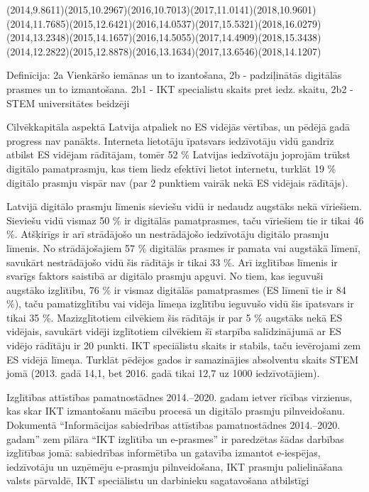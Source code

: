   {(2014,9.8611)(2015,10.2967)(2016,10.7013)(2017,11.0141)(2018,10.9601)}
  {(2014,11.7685)(2015,12.6421)(2016,14.0537)(2017,15.5321)(2018,16.0279)}
  {(2014,13.2348)(2015,14.1657)(2016,14.5055)(2017,14.4909)(2018,15.3438)}
  {(2014,12.2822)(2015,12.8878)(2016,13.1634)(2017,13.6546)(2018,14.1207)}

Definīcija: 2a Vienkāršo iemānas un to izantošana, 2b - padziļinātās digitālās prasmes un to izmantošana.
2b1 - IKT specialistu skaits pret iedz. skaitu, 2b2 - STEM universitātes beidzēji


Cilvēkkapitāla aspektā Latvija atpaliek no ES vidējās vērtības, un pēdējā gadā progress nav
panākts. Interneta lietotāju īpatsvars iedzīvotāju vidū gandrīz atbilst ES vidējam rādītājam,
tomēr 52 \% Latvijas iedzīvotāju joprojām trūkst digitālo pamatprasmju, kas tiem liedz efektīvi
lietot internetu, turklāt 19 \% digitālo prasmju vispār nav (par 2 punktiem vairāk nekā ES
vidējais rādītājs).
\par
Latvijā digitālo prasmju līmenis sieviešu vidū ir nedaudz augstāks nekā vīriešiem. Sieviešu
vidū vismaz 50 \% ir digitālās pamatprasmes, taču vīriešiem tie ir tikai 46 \%. Atšķirīgs ir arī
strādājošo un nestrādājošo iedzīvotāju digitālo prasmju līmenis. No strādājošajiem 57 \%
digitālās prasmes ir pamata vai augstākā līmenī, savukārt nestrādājošo vidū šis rādītājs ir
tikai 33 \%. Arī izglītības līmenis ir svarīgs faktors saistībā ar digitālo prasmju apguvi. No tiem,
kas ieguvuši augstāko izglītību, 76 \% ir vismaz digitālās pamatprasmes (ES līmenī tie ir
84 \%), taču pamatizglītību vai vidēja līmeņa izglītību ieguvušo vidū šis īpatsvars ir tikai 35 \%.
Mazizglītotiem cilvēkiem šis rādītājs ir par 5 \% augstāks nekā ES vidējais, savukārt vidēji
izglītotiem cilvēkiem šī starpība salīdzinājumā ar ES vidējo rādītāju ir 20 punkti. IKT
speciālistu skaits ir stabils, taču ievērojami zem ES vidējā līmeņa. Turklāt pēdējos gados ir
samazinājies absolventu skaits STEM jomā (2013. gadā 14,1, bet 2016. gadā tikai 12,7 uz
1000 iedzīvotājiem).
\par
Izglītības attīstības pamatnostādnes 2014.–2020. gadam ietver rīcības virzienus, kas skar
IKT izmantošanu mācību procesā un digitālo prasmju pilnveidošanu. Dokumentā
“Informācijas sabiedrības attīstības pamatnostādnes 2014.–2020. gadam” zem pīlāra “IKT
izglītība un e-prasmes” ir paredzētas šādas darbības izglītības jomā: sabiedrības informētība
un gatavība izmantot e-iespējas, iedzīvotāju un uzņēmēju e-prasmju pilnveidošana, IKT
prasmju palielināšana valsts pārvaldē, IKT speciālistu un darbinieku sagatavošana atbilstīgi
